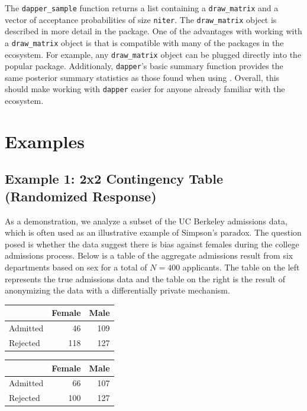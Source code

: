 The \texttt{dapper\_sample} function returns a list containing
a \texttt{draw\_matrix} and a vector of acceptance probabilities of size \texttt{niter}. The \texttt{draw\_matrix} object is described
in more detail in the  package. One of the advantages with working
with a \texttt{draw\_matrix} object is that is compatible with many of the packages in
the  ecosystem. For example, any \texttt{draw\_matrix} object can be
plugged directly into the popular  package. Additionaly,
\texttt{dapper}'s basic summary function provides the same posterior summary statistics
as those found when using . Overall, this should make working with \texttt{dapper} easier
for anyone already familiar with the  ecosystem.

\hypertarget{examples}{%
\section{Examples}\label{examples}}

\hypertarget{example-1-2x2-contingency-table-randomized-response}{%
\subsection{Example 1: 2x2 Contingency Table (Randomized Response)}\label{example-1-2x2-contingency-table-randomized-response}}

As a demonstration, we analyze a subset of the UC Berkeley admissions data, which is often
used as an illustrative example of Simpson's paradox. The question posed is whether
the data suggest there is bias against females during the college admissions
process. Below is a table of the aggregate admissions result from six departments based on sex
for a total of \(N = 400\) applicants. The table on the left represents
the true admissions data and the table on the right is the result of anonymizing
the data with a differentially private mechanism.

\begin{table}[!h]
\centering
\centering
\begin{tabular}[t]{lrr}
\toprule
  & Female & Male\\
\midrule
Admitted & 46 & 109\\
Rejected & 118 & 127\\
\bottomrule
\end{tabular}
\centering
\begin{tabular}[t]{lrr}
\toprule
  & Female & Male\\
\midrule
Admitted & 66 & 107\\
Rejected & 100 & 127\\
\bottomrule
\end{tabular}
\end{table}

